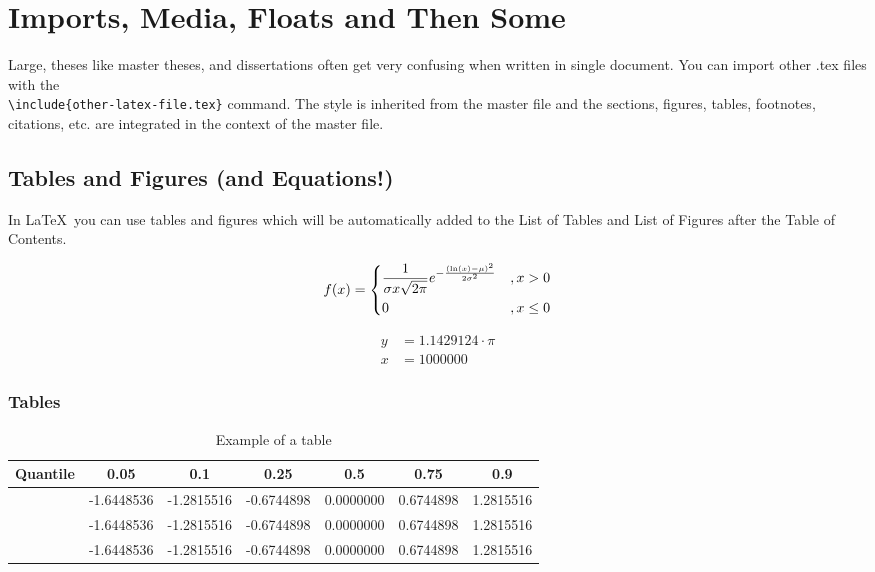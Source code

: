 \documentclass[masterthesis, english]{mas-thesis-chapters} %
\begin{document}
\chapter{Imports, Media, Floats and Then Some}

Large, theses like master theses, and dissertations often get very confusing when written in single document. You can import other .tex files with the\\\texttt{\textbackslash include\{other-latex-file.tex\}} command. The style is inherited from the master file and the sections, figures, tables, footnotes, citations, etc. are integrated in the context of the master file.

\section{Tables and Figures (and Equations!)}

In \LaTeX\ you can use tables and figures which will be automatically added to the List of Tables and List of Figures after the Table of Contents.

\begin{equation*}
        f(x) = 
        \begin{dcases}
            \frac{1}{\sigma x \sqrt{2 \pi}} e^{ - \frac{(\ln(x) - \mu)^2}{2 \sigma^2}} & , x > 0 \\
            0 & , x \leq 0
        \end{dcases}
\end{equation*}

\begin{align}
	y &= 1.1429124 \cdot \pi \\
	x &= 1000000
\end{align}

\subsection{Tables}

\begin{table}[ht]
\begin{center}
        \begin{tabular}{
            S[table-column-width=10mm]
            S[table-format=-1.6]
            S[table-format=-1.6]
            S[table-format=-1.6]
            S[table-format=-1.6]
            S[table-format=-1.6]
            S[table-format=-1.6]}
            \toprule
            {Quantile} & 0.05 & 0.1 & 0.25 & 0.5 & 0.75 & 0.9 \\ 
            \midrule
             & -1.6448536 & -1.2815516 & -0.6744898 & 0.0000000 & 0.6744898 & 1.2815516 \\ 
             & -1.6448536 & -1.2815516 & -0.6744898 & 0.0000000 & 0.6744898 & 1.2815516 \\ 
             & -1.6448536 & -1.2815516 & -0.6744898 & 0.0000000 & 0.6744898 & 1.2815516 \\ 
             \bottomrule
        \end{tabular}
	\caption{Example of a table}
	\label{table:1}
\end{center}
\end{table}
\end{document}
